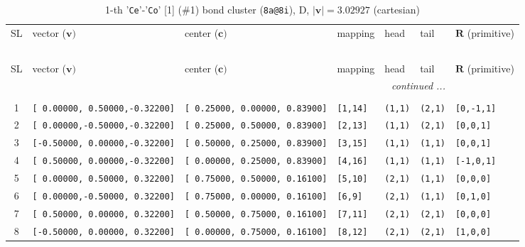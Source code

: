\documentclass[fleqn,10pt,landscape]{jsarticle}
\begin{document}
\renewcommand{\arraystretch}{1.6}
\begin{longtable}[l]{cllllll}
\captionsetup{justification=raggedright, singlelinecheck=off}
\caption{1-th '\texttt{Ce}'-'\texttt{Co}' [1] (\#1) bond cluster (\texttt{8a@8i}), D, $|\bm{v}|=3.02927$ (cartesian)}
 \\
 \hline \hline
SL & vector ($\bm{v})$ & center ($\bm{c})$ & mapping & head & tail & $\bm{R}$ (primitive) \\ \hline \endfirsthead

\multicolumn{6}{l}{\tablename\ \thetable{}} \\
 \hline \hline
SL & vector ($\bm{v})$ & center ($\bm{c})$ & mapping & head & tail & $\bm{R}$ (primitive) \\ \hline \endhead

 \hline \hline
\multicolumn{6}{r}{\footnotesize\it continued ...} \\ \endfoot

 \hline \hline
\multicolumn{6}{r}{} \\ \endlastfoot

1 & \texttt{[ 0.00000, 0.50000,-0.32200]} & \texttt{[ 0.25000, 0.00000, 0.83900]} & \texttt{[1,14]} & \texttt{(1,1)} & \texttt{(2,1)} & \texttt{[0,-1,1]} \\ \hline
2 & \texttt{[ 0.00000,-0.50000,-0.32200]} & \texttt{[ 0.25000, 0.50000, 0.83900]} & \texttt{[2,13]} & \texttt{(1,1)} & \texttt{(2,1)} & \texttt{[0,0,1]} \\ \hline
3 & \texttt{[-0.50000, 0.00000,-0.32200]} & \texttt{[ 0.50000, 0.25000, 0.83900]} & \texttt{[3,15]} & \texttt{(1,1)} & \texttt{(1,1)} & \texttt{[0,0,1]} \\ \hline
4 & \texttt{[ 0.50000, 0.00000,-0.32200]} & \texttt{[ 0.00000, 0.25000, 0.83900]} & \texttt{[4,16]} & \texttt{(1,1)} & \texttt{(1,1)} & \texttt{[-1,0,1]} \\ \hline
5 & \texttt{[ 0.00000, 0.50000, 0.32200]} & \texttt{[ 0.75000, 0.50000, 0.16100]} & \texttt{[5,10]} & \texttt{(2,1)} & \texttt{(1,1)} & \texttt{[0,0,0]} \\ \hline
6 & \texttt{[ 0.00000,-0.50000, 0.32200]} & \texttt{[ 0.75000, 0.00000, 0.16100]} & \texttt{[6,9]} & \texttt{(2,1)} & \texttt{(1,1)} & \texttt{[0,1,0]} \\ \hline
7 & \texttt{[ 0.50000, 0.00000, 0.32200]} & \texttt{[ 0.50000, 0.75000, 0.16100]} & \texttt{[7,11]} & \texttt{(2,1)} & \texttt{(2,1)} & \texttt{[0,0,0]} \\ \hline
8 & \texttt{[-0.50000, 0.00000, 0.32200]} & \texttt{[ 0.00000, 0.75000, 0.16100]} & \texttt{[8,12]} & \texttt{(2,1)} & \texttt{(2,1)} & \texttt{[1,0,0]} \\
\end{longtable}
\end{document}
